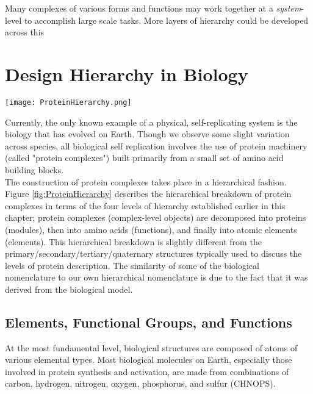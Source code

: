 {Many complexes of various forms and functions may work together at a \textit{system}-level to accomplish large scale tasks.  More layers of hierarchy could be developed across this 

\section{Design Hierarchy in Biology}

\begin{sidewaysfigure}
  \texttt{[image: ProteinHierarchy.png]}
  \caption{Hierarchical breakdown of protein complexes (complexes) into proteins (modules), amino acids (functions), and atoms (elements).}
  \label{fig:ProteinHierarchy}
\end{sidewaysfigure}


Currently, the only known example of a physical, self-replicating system is the biology that has evolved on Earth.  Though we observe some slight variation across species, all biological self replication involves the use of protein machinery (called "protein complexes") built primarily from a small set of amino acid building blocks.\\

The construction of protein complexes takes place in a hierarchical fashion.  Figure \ref{fig:ProteinHierarchy} describes the hierarchical breakdown of protein complexes in terms of the four levels of hierarchy established earlier in this chapter; protein complexes (complex-level objects) are decomposed into proteins (modules), then into amino acids (functions), and finally into atomic elements (elements).  This hierarchical breakdown is slightly different from the primary/secondary/tertiary/quaternary structures typically used to discuss the levels of protein description.  The similarity of some of the biological nomenclature to our own hierarchical nomenclature is due to the fact that it was derived from the biological model.

\subsection{Elements, Functional Groups, and Functions}

At the most fundamental level, biological structures are composed of atoms of various elemental types.  Most biological molecules on Earth, especially those involved in protein synthesis and activation, are made from combinations of carbon, hydrogen, nitrogen, oxygen, phosphorus, and sulfur (CHNOPS).\\

}
